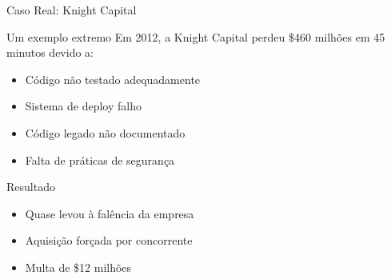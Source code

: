 \documentclass[10pt, aspectratio=169]{beamer}
\begin{document}
\begin{frame}{Caso Real: Knight Capital}
\begin{alertblock}{Um exemplo extremo}
Em 2012, a Knight Capital perdeu \$460 milhões em 45 minutos devido a:
\begin{itemize}
    \item Código não testado adequadamente
    \item Sistema de deploy falho
    \item Código legado não documentado
    \item Falta de práticas de segurança
\end{itemize}
\end{alertblock}

\begin{block}{Resultado}
\begin{itemize}
    \item Quase levou à falência da empresa
    \item Aquisição forçada por concorrente
    \item Multa de \$12 milhões
\end{itemize}
\end{block}
\end{frame}
\end{document}

